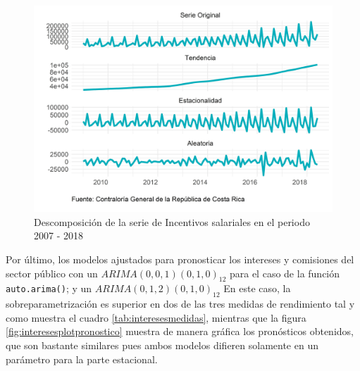 \documentclass[
]{article}
\begin{document}
\begin{figure}[!h]
\includegraphics[width=1\linewidth,height=1\textheight]{Tesis_files/figure-latex/interesesplotdescomposicion-1} \caption{Descomposición de la serie de Incentivos salariales en el periodo 2007 - 2018}\label{fig:interesesplotdescomposicion}
\end{figure}

Por último, los modelos ajustados para pronosticar los intereses y
comisiones del sector público con un \(ARIMA(0,0,1)(0,1,0)_{12}\) para
el caso de la función \texttt{auto.arima()}; y un
\(ARIMA(0,1,2)(0,1,0)_{12}\) En este caso, la sobreparametrización es
superior en dos de las tres medidas de rendimiento tal y como muestra el
cuadro \ref{tab:interesesmedidas}, mientras que la figura
\ref{fig:interesesplotpronostico} muestra de manera gráfica los
pronósticos obtenidos, que son bastante similares pues ambos modelos
difieren solamente en un parámetro para la parte estacional.

\begin{table}[!h]

\caption{\label{tab:unnamed-chunk-22}\label{tab:interesesmedidas}Medidas de rendimiento según método de estimación para los intereses y comisiones del sector público}
\centering
{}
\end{table}
\end{document}
